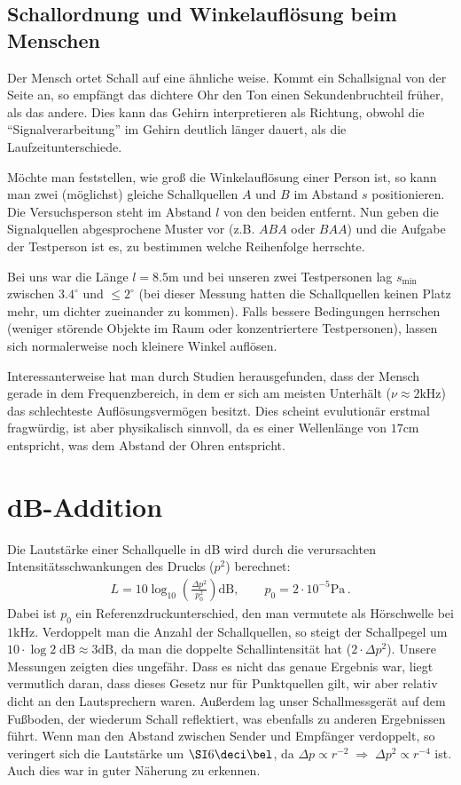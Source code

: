 \documentclass[12pt,a4paper,titlepage,headinclude,bibtotoc]{scrartcl}
\begin{document}
\subsection{Schallordnung und Winkelauflösung beim Menschen}
Der Mensch ortet Schall auf eine ähnliche weise.
Kommt ein Schallsignal von der Seite an, so empfängt das dichtere Ohr den Ton einen Sekundenbruchteil früher, als das andere.
Dies kann das Gehirn interpretieren als Richtung, obwohl die "`Signalverarbeitung"' im Gehirn deutlich länger dauert, als die Laufzeitunterschiede.

Möchte man feststellen, wie groß die Winkelauflösung einer Person ist, so kann man zwei (möglichst) gleiche Schallquellen $A$ und $B$ im Abstand $s$ positionieren.
Die Versuchsperson steht im Abstand $l$ von den beiden entfernt.
Nun geben die Signalquellen abgesprochene Muster vor (z.B. $ABA$ oder $BAA$) und die Aufgabe der Testperson ist es, zu bestimmen welche Reihenfolge herrschte.

Bei uns war die Länge $l=8.5\si\meter$ und bei unseren zwei Testpersonen lag $s_\text{min}$ zwischen $3.4^\circ$ und $\leq2^\circ$ (bei dieser Messung hatten die Schallquellen keinen Platz mehr, um dichter zueinander zu kommen).
Falls bessere Bedingungen herrschen (weniger störende Objekte im Raum oder konzentriertere Testpersonen), lassen sich normalerweise noch kleinere Winkel auflösen.

Interessanterweise hat man durch Studien herausgefunden, dass der Mensch gerade in dem Frequenzbereich, in dem er sich am meisten Unterhält ($\nu\approx2\si{\kilo\hertz}$) das schlechteste Auflösungsvermögen besitzt.
Dies scheint evulutionär erstmal fragwürdig, ist aber physikalisch sinnvoll, da es einer Wellenlänge von $17\si{\centi\meter}$ entspricht, was dem Abstand der Ohren entspricht.


\section{dB-Addition}
Die Lautstärke einer Schallquelle in dB wird durch die verursachten Intensitätsschwankungen des Drucks ($p^2$) berechnet:
\begin{align*}
	L=10\log_{10}\left( \frac{\Delta p^2}{p_0^2} \right)\si{\deci\bel}, \qquad p_0=2\cdot10^{-5}\si\pascal\, .
\end{align*}
Dabei ist $p_0$ ein Referenzdruckunterschied, den man vermutete als Hörschwelle bei $1\si{\kilo\hertz}$.
Verdoppelt man die Anzahl der Schallquellen, so steigt der Schallpegel um $10\cdot\log2\;\si{\deci\bel}\approx3\si{\deci\bel}$, da man die doppelte Schallintensität hat ($2\cdot\Delta p^2$).
Unsere Messungen zeigten dies ungefähr.
Dass es nicht das genaue Ergebnis war, liegt vermutlich daran, dass dieses Gesetz nur für Punktquellen gilt, wir aber relativ dicht an den Lautsprechern waren.
Außerdem lag unser Schallmessgerät auf dem Fußboden, der wiederum Schall reflektiert, was ebenfalls zu anderen Ergebnissen führt.
Wenn man den Abstand zwischen Sender und Empfänger verdoppelt, so veringert sich die Lautstärke um $\SI6{\deci\bel}$, da $\Delta p\propto r^{-2}\;\Rightarrow\;\Delta p^2\propto r^{-4}$ ist.
Auch dies war in guter Näherung zu erkennen.
\end{document}
